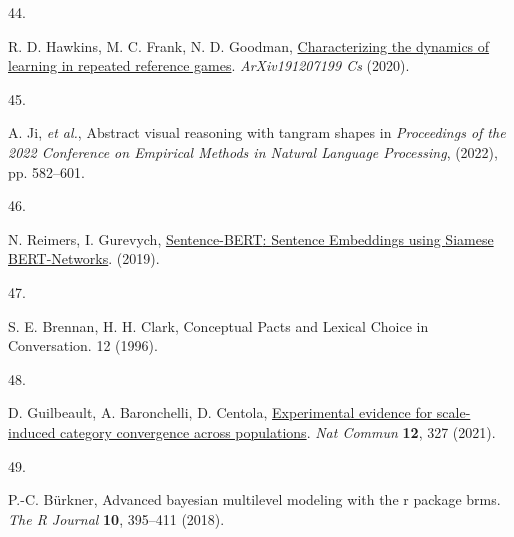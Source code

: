 \documentclass[9pt,twocolumn,twoside]{pnas-new}
\makeatletter
\newlength{\cslhangindent}
\newlength{\csllabelwidth}
\newenvironment{CSLReferences}[2] %
 {\begin{list}{}{%
  \setlength{\itemindent}{0pt}
  \setlength{\leftmargin}{0pt}
  \setlength{\parsep}{0pt}
   \normalfont\sffamily\fontsize{6}{8}\selectfont
    \labelsep2.8pt
   \renewcommand\newblock{\hskip .11em \@plus.33em \@minus.07em}
  \ifodd #1
   \setlength{\leftmargin}{\cslhangindent}
   \setlength{\itemindent}{-1\cslhangindent}
  \fi
  \setlength{\itemsep}{0.0pt}}}
 {\end{list}}
\newcommand{\CSLLeftMargin}[1]{\parbox[t]{\csllabelwidth}{#1}}
\newcommand{\CSLRightInline}[1]{\parbox[t]{\linewidth - \csllabelwidth}{#1}\break}
\makeatother
\begin{document}
\begin{CSLReferences}{0}{1}
	\CSLLeftMargin{44. }%
	\CSLRightInline{R. D. Hawkins, M. C. Frank, N. D. Goodman,
		\href{http://arxiv.org/abs/1912.07199}{Characterizing the dynamics of
			learning in repeated reference games}. \emph{ArXiv191207199 Cs} (2020).}
	
	\CSLLeftMargin{45. }%
	\CSLRightInline{A. Ji, \emph{et al.}, Abstract visual reasoning with
		tangram shapes in \emph{Proceedings of the 2022 Conference on Empirical
			Methods in Natural Language Processing}, (2022), pp. 582--601.}
	
	\CSLLeftMargin{46. }%
	\CSLRightInline{N. Reimers, I. Gurevych,
		\href{https://doi.org/10.48550/arXiv.1908.10084}{Sentence-{BERT}:
			{Sentence Embeddings} using {Siamese BERT-Networks}}. (2019).}
	
	\CSLLeftMargin{47. }%
	\CSLRightInline{S. E. Brennan, H. H. Clark, Conceptual {Pacts} and
		{Lexical Choice} in {Conversation}. 12 (1996).}
	
	\CSLLeftMargin{48. }%
	\CSLRightInline{D. Guilbeault, A. Baronchelli, D. Centola,
		\href{https://doi.org/10.1038/s41467-020-20037-y}{Experimental evidence
			for scale-induced category convergence across populations}. \emph{Nat
			Commun} \textbf{12}, 327 (2021).}
	
	\CSLLeftMargin{49. }%
	\CSLRightInline{P.-C. Bürkner, Advanced bayesian multilevel modeling
		with the r package brms. \emph{The R Journal} \textbf{10}, 395--411
		(2018).}
	
\end{CSLReferences}



% 
\end{document}
